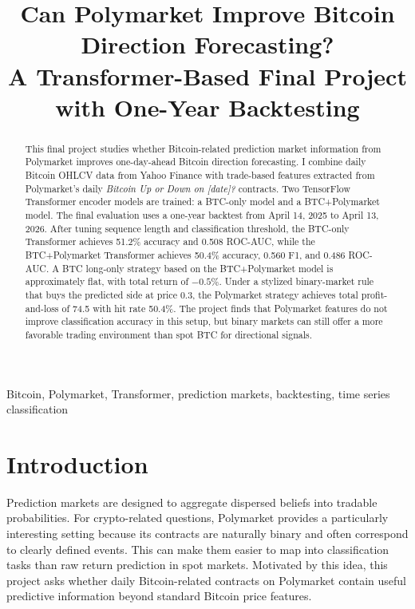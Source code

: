\documentclass[conference]{IEEEtran}
\begin{document}
\title{Can Polymarket Improve Bitcoin Direction Forecasting?\\
\large A Transformer-Based Final Project with One-Year Backtesting}

\author{
}

\maketitle

\begin{abstract}
This final project studies whether Bitcoin-related prediction market information from Polymarket improves one-day-ahead Bitcoin direction forecasting. I combine daily Bitcoin OHLCV data from Yahoo Finance with trade-based features extracted from Polymarket's daily \emph{Bitcoin Up or Down on [date]?} contracts. Two TensorFlow Transformer encoder models are trained: a BTC-only model and a BTC+Polymarket model. The final evaluation uses a one-year backtest from April 14, 2025 to April 13, 2026. After tuning sequence length and classification threshold, the BTC-only Transformer achieves 51.2\% accuracy and 0.508 ROC-AUC, while the BTC+Polymarket Transformer achieves 50.4\% accuracy, 0.560 F1, and 0.486 ROC-AUC. A BTC long-only strategy based on the BTC+Polymarket model is approximately flat, with total return of $-0.5\%$. Under a stylized binary-market rule that buys the predicted side at price 0.3, the Polymarket strategy achieves total profit-and-loss of 74.5 with hit rate 50.4\%. The project finds that Polymarket features do not improve classification accuracy in this setup, but binary markets can still offer a more favorable trading environment than spot BTC for directional signals.
\end{abstract}

\begin{IEEEkeywords}
Bitcoin, Polymarket, Transformer, prediction markets, backtesting, time series classification
\end{IEEEkeywords}

\section{Introduction}
Prediction markets are designed to aggregate dispersed beliefs into tradable probabilities. For crypto-related questions, Polymarket provides a particularly interesting setting because its contracts are naturally binary and often correspond to clearly defined events. This can make them easier to map into classification tasks than raw return prediction in spot markets. Motivated by this idea, this project asks whether daily Bitcoin-related contracts on Polymarket contain useful predictive information beyond standard Bitcoin price features.
\end{document}
